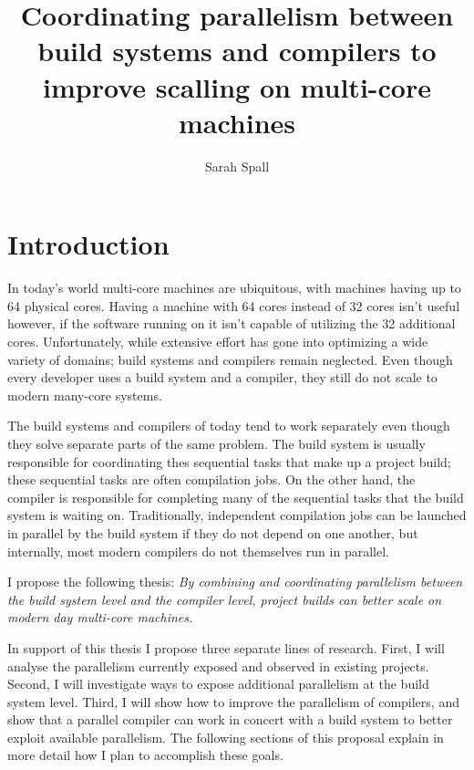 \documentclass[10pt]{article}
\begin{document}
\title{Coordinating parallelism between build systems and compilers to improve scalling on multi-core machines}
\author{Sarah Spall}
\date{}
\maketitle

\section{Introduction}

In today's world multi-core machines are ubiquitous, with machines having up to 64 physical cores.
Having a machine with 64 cores instead of 32 cores isn't useful however, if the software running
on it isn't capable of utilizing the 32 additional cores.  Unfortunately, while extensive effort
has gone into optimizing a wide variety of domains; build systems and compilers remain
neglected. Even though every developer
uses a build system and a compiler, they still do not scale to modern many-core systems.

The build systems and compilers of today tend to work separately even though they solve
separate parts of the same problem.  The build system is usually responsible for coordinating
thes sequential tasks that make up a project build; these sequential tasks are often
compilation jobs.  On the other hand, the compiler is responsible for completing many of the sequential
tasks that the build system is waiting on.  Traditionally, independent compilation jobs can be
launched in parallel by the build system if they do not depend on one another, but internally,
most modern compilers do not themselves run in parallel.

I propose the following thesis: \emph{By combining and coordinating parallelism between the build system level
and the compiler level, project builds can better scale on modern day multi-core
machines.}

In support of this thesis I propose three separate lines of research.  First, I will analyse the parallelism
currently exposed and observed in existing projects.  Second, I will investigate ways to expose
additional parallelism at the build system level.  Third, I will show how to improve the
parallelism of compilers, and show that a parallel compiler can work
in concert with a build system to better exploit available parallelism.  The following
sections of this proposal explain in more detail how I plan to accomplish these goals.
\end{document}
